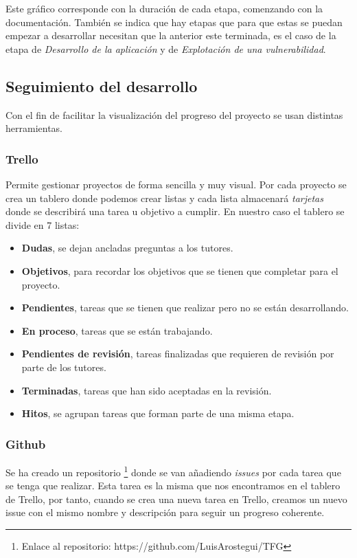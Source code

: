 Este gráfico corresponde con la duración de cada etapa, comenzando con la documentación. También se indica que hay etapas que para que estas se puedan empezar a desarrollar necesitan que la anterior este terminada, es el caso de la etapa de \textit{Desarrollo de la aplicación} y de \textit{Explotación de una vulnerabilidad}.

\subsection{Seguimiento del desarrollo}

Con el fin de facilitar la visualización del progreso del proyecto se usan distintas herramientas.

\subsubsection{Trello}

Permite gestionar proyectos de forma sencilla y muy visual. Por cada proyecto se crea un tablero donde podemos crear listas y cada lista almacenará \textit{tarjetas} donde se describirá una tarea u objetivo a cumplir. En nuestro caso el tablero se divide en 7 listas:

\begin{itemize}
    \item \textbf{Dudas}, se dejan ancladas preguntas a los tutores.
    \item \textbf{Objetivos}, para recordar los objetivos que se tienen que completar para el proyecto.
    \item \textbf{Pendientes}, tareas que se tienen que realizar pero no se están desarrollando.
    \item \textbf{En proceso}, tareas que se están trabajando.
    \item \textbf{Pendientes de revisión}, tareas finalizadas que requieren de revisión por parte de los tutores.
    \item \textbf{Terminadas}, tareas que han sido aceptadas en la revisión.
    \item \textbf{Hitos}, se agrupan tareas que forman parte de una misma etapa.
\end{itemize}

\subsubsection{Github}

Se ha creado un repositorio \footnote{Enlace al repositorio: https://github.com/LuisArostegui/TFG} donde se van añadiendo \textit{issues} por cada tarea que se tenga que realizar. Esta tarea es la misma que nos encontramos en el tablero de Trello, por tanto, cuando se crea una nueva tarea en Trello, creamos un nuevo issue con el mismo nombre y descripción para seguir un progreso coherente.\\

